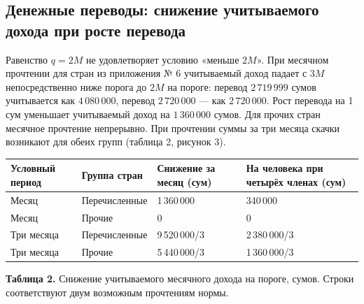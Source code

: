 \documentclass[12pt,a4paper]{extarticle}
\begin{document}
\subsection{Денежные переводы: снижение учитываемого дохода при росте перевода}
Равенство $q=2M$ не удовлетворяет условию «меньше $2M$». При месячном прочтении для стран из приложения № 6 учитываемый доход падает с $3M$ непосредственно ниже порога до $2M$ на пороге: перевод $2\,719\,999$ сумов учитывается как $4\,080\,000$, перевод $2\,720\,000$ — как $2\,720\,000$. Рост перевода на 1 сум уменьшает учитываемый доход на $1\,360\,000$ сумов. Для прочих стран месячное прочтение непрерывно. При прочтении суммы за три месяца скачки возникают для обеих групп (таблица 2, рисунок 3).

\begingroup\fontsize{11bp}{13.2bp}\selectfont
\begin{longtable}{p{} p{} p{} p{}}
\toprule
Условный период & Группа стран & Снижение за месяц (сум) & На человека при четырёх членах (сум) \\
\midrule
\endhead
Месяц & Перечисленные & 1\,360\,000 & 340\,000 \\
Месяц & Прочие & 0 & 0 \\
Три месяца & Перечисленные & 9\,520\,000/3 & 2\,380\,000/3 \\
Три месяца & Прочие & 5\,440\,000/3 & 1\,360\,000/3 \\
\bottomrule
\end{longtable}
\endgroup
\textbf{Таблица 2.} Снижение учитываемого месячного дохода на пороге, сумов. Строки соответствуют двум возможным прочтениям нормы.
\end{document}
